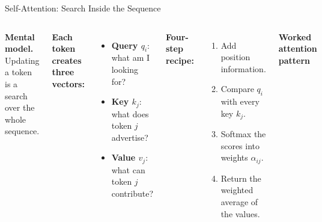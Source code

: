 \documentclass[aspectratio=169,11pt]{beamer}
\begin{document}
\begin{frame}{Self-Attention: Search Inside the Sequence}
\footnotesize
\begin{columns}[T]
\textbf{Mental model.} Updating a token is a search over the whole sequence.

\vspace{0.04cm}
\textbf{Each token creates three vectors:}
\begin{itemize}\itemsep0pt
    \item[\textcolor{softblue}{$\blacktriangleright$}] \textcolor{softblue}{\textbf{Query $q_i$}}: what am I looking for?
    \item[\textcolor{harvardcrimson}{$\blacktriangleright$}] \textcolor{harvardcrimson}{\textbf{Key $k_j$}}: what does token $j$ advertise?
    \item[\textcolor{softgreen}{$\blacktriangleright$}] \textcolor{softgreen}{\textbf{Value $v_j$}}: what can token $j$ contribute?
\end{itemize}

\vspace{0.04cm}
\textbf{Four-step recipe:}
\begin{enumerate}\itemsep0pt
    \item Add position information.
    \item Compare $q_i$ with every key $k_j$.
    \item Softmax the scores into weights $\alpha_{ij}$.
    \item Return the weighted average of the values.
\end{enumerate}

\centering
{\small\textbf{Worked attention pattern}}


\end{columns}
\end{frame}
\end{document}

